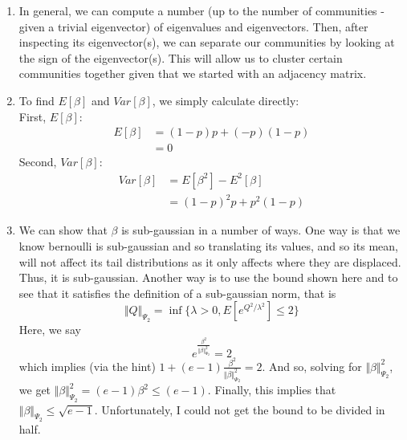 \documentclass[11pt]{article}
\begin{document}
\begin{enumerate}
\begin{proof}
\begin{align*}
	\begin{bmatrix}
	2p & \cdots & 2q \\
	\vdots & & \vdots \\
	2q & \cdots & 2p
	\end{bmatrix}\right) \\
	&= M
	\end{align*}
	\end{proof}
	\item In general, we can compute a number (up to the number of communities - given a trivial eigenvector) of eigenvalues and eigenvectors. Then, after inspecting its eigenvector(s), we can separate our communities by looking
	at the sign of the eigenvector(s). This will allow us to cluster certain communities together given that we started with an adjacency matrix.
	\item To find $E[\beta]$ and $Var[\beta]$, we simply calculate directly: \\
	First, $E[\beta]$:
	\begin{align*}
		E[\beta] &= (1 - p)p + (-p)(1-p) \\
		&= \boxed{0}
	\end{align*}
	Second, $Var[\beta]$:
	\begin{align*}
		Var[\beta] &= E[\beta^2] - E^2[\beta] \\
		&= \boxed{(1-p)^2 p + p^2 (1-p)}
	\end{align*}
	\item We can show that $\beta$ is sub-gaussian in a number of ways. One way is that we know bernoulli is sub-gaussian and so translating its values, and so its mean, will not affect its tail distributions as it only affects where they are displaced.
	Thus, it is sub-gaussian. Another way is to use the bound shown here and to see that it satisfies the definition of a sub-gaussian norm, that is
	\begin{equation*}
		\Vert Q \Vert_{\Psi_2} = \inf \{ \lambda > 0, E \left[e^{Q^2/\lambda^2} \right] \le 2\}
	\end{equation*}
	Here, we say
	\begin{equation}
		e^{\frac{\beta^2}{\Vert \beta \Vert_{\Psi_2}^2}} = 2
	\end{equation}
	which implies (via the hint) $1 + (e-1)\frac{\beta^2}{\Vert \beta \Vert_{\Psi_2}^2} = 2$. And so, solving for $\Vert \beta \Vert_{\Psi_2}^2$, we get $\Vert \beta \Vert_{\Psi_2}^2 = (e-1)\beta^2 \le (e-1)$. Finally, this implies that $\Vert \beta \Vert_{\Psi_2} \le \sqrt{e-1}$. Unfortunately, I could not get the bound to be divided in half.

\end{enumerate}
\end{document}
